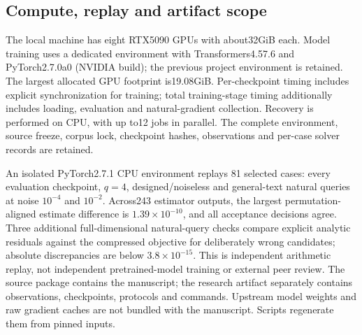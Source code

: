 \subsection{Compute, replay and artifact scope}



The local machine has eight RTX5090 GPUs with about32GiB each. Model
 training uses a dedicated environment with Transformers4.57.6 and
PyTorch2.7.0a0 (NVIDIA build); the previous project environment is retained.
The largest allocated GPU footprint is19.08GiB. Per-checkpoint timing
 includes explicit synchronization for training; total training-stage
 timing additionally includes loading, evaluation and natural-gradient
 collection. Recovery is performed on CPU, with up to12 jobs in parallel.
The complete environment, source freeze, corpus lock, checkpoint hashes,
 observations and per-case solver records are retained.

An isolated PyTorch2.7.1 CPU environment replays 81 selected cases:
 every evaluation checkpoint, $q=4$, designed/noiseless and general-text
 natural queries at noise $10^{-4}$ and $10^{-2}$. Across243 estimator
 outputs, the largest permutation-aligned estimate difference is
$1.39\times10^{-10}$, and all acceptance decisions agree. Three additional
 full-dimensional natural-query checks compare explicit analytic residuals
 against the compressed objective for deliberately wrong candidates;
 absolute discrepancies are below $3.8\times10^{-15}$. This is independent
 arithmetic replay, not independent pretrained-model training or external
 peer review. The source package contains the manuscript; the research
 artifact separately contains observations, checkpoints, protocols and
 commands. Upstream model weights and raw gradient caches are not bundled
 with the manuscript. Scripts regenerate them from pinned inputs.
